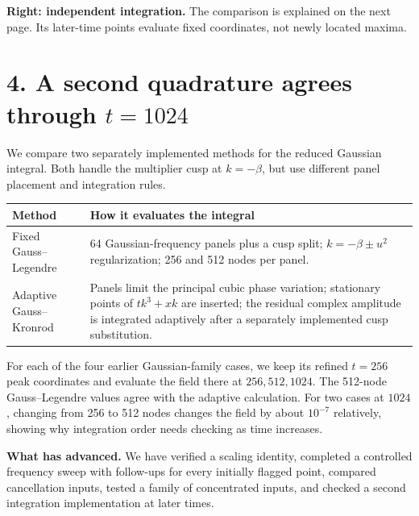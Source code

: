 \textbf{Right: independent integration.} The comparison is explained on the next
page. Its later-time points evaluate fixed coordinates, not newly located maxima.

\newpage
{}
\section*{4. A second quadrature agrees through $t=1024$}
We compare two separately implemented methods for the reduced Gaussian integral.
Both handle the multiplier cusp at $k=-\beta$, but use different panel placement
and integration rules.
\begin{center}\begin{tabular}{p{.26\linewidth}p{.65\linewidth}}\toprule
Method & How it evaluates the integral\\\midrule
Fixed Gauss--Legendre & 64 Gaussian-frequency panels plus a cusp split;
$k=-\beta\pm u^2$ regularization; 256 and 512 nodes per panel.\\
Adaptive Gauss--Kronrod & Panels limit the principal cubic phase variation;
stationary points of $tk^3+xk$ are inserted; the residual complex amplitude is
integrated adaptively after a separately implemented cusp substitution.\\\bottomrule
\end{tabular}\end{center}
For each of the four earlier Gaussian-family cases, we keep its refined $t=256$
peak coordinates and evaluate the field there at $256,512,1024$. The 512-node
Gauss--Legendre values agree with the adaptive calculation. For two cases at
$1024$, changing from 256 to 512 nodes changes the field by about $10^{-7}$
relatively, showing why integration order needs checking as time increases.

\textbf{What has advanced.} We have verified a scaling identity, completed a
controlled frequency sweep with follow-ups for every initially flagged point,
compared cancellation inputs, tested a family of concentrated inputs, and checked
a second integration implementation at later times.

